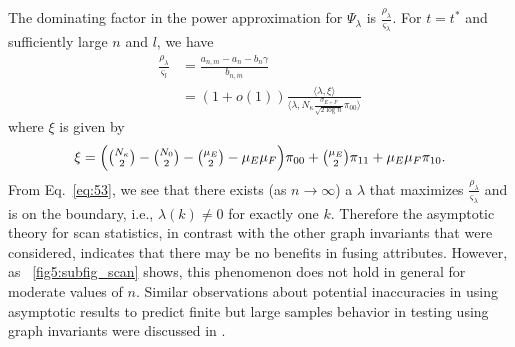 \documentclass[10pt,journal,compsoc]{IEEEtran}
\theoremstyle{definition}
\begin{document}
The dominating factor in the power approximation for $\Psi_{\lambda}$
is $\tfrac{\rho_{\lambda}}{\varsigma_{\lambda}}$. For $t = t^{*}$ and
sufficiently large $n$ and $l$, we have
\begin{equation}
  \label{eq:53}
  \begin{split}
    \frac{\rho_{\lambda}}{\varsigma_{l}} &= \frac{a_{n,m} - a_n - b_n
      \gamma}{b_{n,m}} \\
    &= (1 + o(1)) \frac{ \langle \lambda, \xi \rangle}{\langle
      \lambda, N_{\kappa} \tfrac{\sigma_{E+F}}{\sqrt{2 \log{n}}}
      \pi_{00} \rangle}
  \end{split}
\end{equation}
where $\xi$ is given by
\begin{equation*}
 \xi =  \Bigl(\tbinom{N_{\kappa}}{2} -
    \tbinom{N_0}{2} - \tbinom{\mu_E}{2} - \mu_E \mu_F\Bigr)\pi_{00} +
    \tbinom{\mu_{E}}{2} \pi_{11} + \mu_E \mu_F \pi_{10}.
\end{equation*}
From Eq.~\eqref{eq:53}, we see that there exists (as $n \rightarrow
\infty$) a $\lambda$ that maximizes
$\tfrac{\rho_\lambda}{\varsigma_{\lambda}}$ and is on the boundary,
i.e., $\lambda(k) \not = 0$ for exactly one $k$. Therefore the asymptotic theory
for scan statistics, in contrast with the other graph invariants that
were considered, indicates that there may be no benefits in fusing
attributes. However, as \figurename~\ref{fig5:subfig_scan} shows, this
phenomenon does not hold in general for moderate values of
$n$. Similar observations about potential inaccuracies in using
asymptotic results to predict finite but large samples behavior
in testing using graph invariants were discussed in
\cite{rukhin11,priebe10:_you_i}.   
\end{document}
